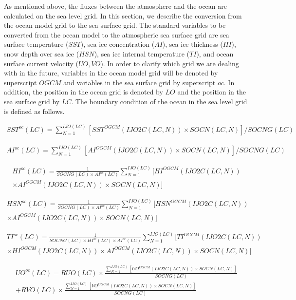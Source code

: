 As mentioned above, the fluxes between the atmosphere and the ocean are calculated on the sea level grid. In this section, we describe the conversion from the ocean model grid to the sea surface grid.
The standard variables to be converted from the ocean model to the atmospheric sea surface grid are sea surface temperature (\(SST\)), sea ice concentration (\(AI\)), sea ice thickness (\(HI\)), snow
depth over sea ice (\(HSN\)), sea ice internal temperature (\(TI\)), and ocean surface current velocity (\(UO,VO\)). In order to clarify which grid we are dealing with in the future, variables in the
ocean model grid will be denoted by superscript \(OGCM\) and variables in the sea surface grid by superscript \(oc\). In addition, the position in the ocean grid is denoted by \(LO\) and the position
in the sea surface grid by \(LC\). The boundary condition of the ocean in the sea level grid is defined as follows.

\begin{eqnarray} SST^{oc}(LC) = \sum_{N=1}^{IJO(LC)}[SST^{OGCM}(IJO2C(LC,N)) \times SOCN(LC,N)]/SOCNG(LC) \end{eqnarray}

\begin{eqnarray} AI^{oc}(LC) = \sum_{N=1}^{IJO(LC)}[AI^{OGCM}(IJO2C(LC,N)) \times SOCN(LC,N)]/SOCNG(LC) \end{eqnarray}

\begin{eqnarray} HI^{oc}(LC) = \frac{1}{{SOCNG(LC) \times AI^{oc}(LC)}}\sum_{N=1}^{IJO(LC)}[HI^{OGCM}(IJO2C(LC,N)) \\ \times AI^{OGCM}(IJO2C(LC,N))   \times SOCN(LC,N)] \end{eqnarray}

\begin{eqnarray} HSN^{oc}(LC) = \frac{1}{{SOCNG(LC) \times AI^{oc}(LC)}}\sum_{N=1}^{IJO(LC)}[HSN^{OGCM}(IJO2C(LC,N)) \\ \times AI^{OGCM}(IJO2C(LC,N)) \times SOCN(LC,N)] \end{eqnarray}

\begin{eqnarray} TI^{oc}(LC) = \frac{1}{{SOCNG(LC) \times HI^{oc}(LC) \times AI^{oc}(LC)}}  \sum_{N=1}^{IJO(LC)}[TI^{OGCM}(IJO2C(LC,N)) \\ \times HI^{OGCM}(IJO2C(LC,N)) \times AI^{OGCM}(IJO2C(LC,N)) \times SOCN(LC,N)]  \end{eqnarray}

\begin{eqnarray} UO^{oc}(LC)= RUO(LC) \times  \frac{\sum_{N=1}^{IJO(LC)}[UO^{OGCM}(IJO2C(LC,N)) \times SOCN(LC,N)]}{SOCNG(LC)}  \\ + RVO(LC) \times  \frac{\sum_{N=1}^{IJO(LC)}[VO^{OGCM}(IJO2C(LC,N)) \times SOCN(LC,N)]}{SOCNG(LC)} \end{eqnarray}

